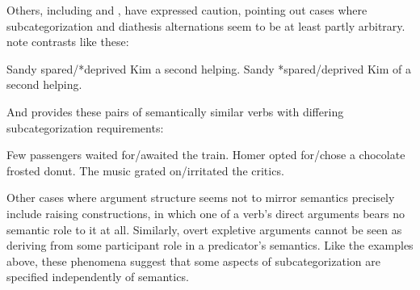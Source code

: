 \documentclass[output=paper,biblatex,babelshorthands,newtxmath,draftmode,colorlinks, citecolor=brown]{langscibook}
\begin{document}
Others, including \citet[Section~5.3]{pollard+sag:1987} and \citet[Section~5.1]{Davis2001}, have
expressed caution, pointing out cases where subcategorization and diathesis
alternations seem to be at least partly arbitrary. \citet[ex.\ 214--215]{pollard+sag:1987} note contrasts like these:

\eal
\ex    Sandy spared/*deprived Kim a second helping.
\ex    Sandy *spared/deprived Kim of a second helping.
\zl

\noindent
And \citet[ex.\ 5.4]{Davis2001} provides these pairs of semantically similar verbs with differing subcategorization requirements:

\eal
\label{ard-subcat-ex}
\ex    Few passengers waited for/awaited the train.
\ex    Homer opted for/chose a chocolate frosted donut.
\ex    The music grated on/irritated the critics.
\zl

\noindent
Other cases where argument structure seems not to mirror semantics precisely include raising
constructions, in which one of a verb's direct arguments bears no semantic role to it at all.
Similarly, overt expletive arguments cannot be seen as deriving from some participant role in a
predicator's semantics.  Like the examples above, these phenomena suggest that some aspects of
subcategorization are specified independently of semantics.
\end{document}
